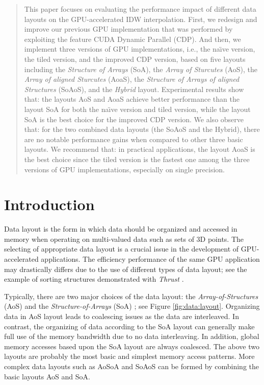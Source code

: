 \begin{abstract}
This paper focuses on evaluating the performance impact of different data 
layouts on the GPU-accelerated IDW interpolation. First, we redesign and improve our 
previous GPU implementation that was performed by exploiting the feature 
CUDA Dynamic Parallel (CDP). And then, we 
implement three versions of GPU implementations, i.e., the na\"{\i}ve 
version, the tiled version, and the improved CDP version, based on five 
layouts including the \textit{Structure of Arrays} (SoA), the \textit{Array of Sturcutes} (AoS), the \textit{Array of aligned Sturcutes} (AoaS), the \textit{Structure of Arrays of aligned Structures} (SoAoS), and the 
\textit{Hybrid} layout. Experimental results show that: the layouts AoS and AoaS achieve 
better performance than the layout SoA for both the na\"{\i}ve version and 
tiled version, while the layout SoA is the best choice for the improved CDP 
version. We also observe that: for the two combined data layouts (the SoAoS 
and the Hybrid), there are no notable performance gains when compared to 
other three basic layouts. We recommend that: in practical applications, the 
layout AoaS is the best choice since the tiled version is the fastest one 
among the three versions of GPU implementations, especially on single 
precision. 
 
\end{abstract}

\section{Introduction}
\label{sec:introduction}

Data layout is the form in which data should be organized and accessed in 
memory when operating on multi-valued data such as sets of 3D points. The 
selecting of appropriate data layout is a crucial issue in the development 
of GPU-accelerated applications. The efficiency performance of the same GPU 
application may drastically differs due to the use of different types of 
data layout; see the example of sorting structures demonstrated with 
\textit{Thrust} \cite{bell2011}. 

Typically, there are two major choices of the data layout: the 
\textit{Array-of-Structures} (AoS) and the \textit{Structure-of-Arrays} (SoA) \cite{farber2011}; see Figure \ref{fig:data:layout}. Organizing data in AoS layout 
leads to coalescing issues as the data are interleaved. In contrast, the 
organizing of data according to the SoA layout can generally make full use 
of the memory bandwidth due to no data interleaving. In addition, global 
memory accesses based upon the SoA layout are always coalesced. The above 
two layouts are probably the most basic and simplest memory access patterns.
More complex data layouts such as AoSoA \cite{abel1999} and SoAoS \cite{siegel2009} can be formed 
by combining the basic layouts AoS and SoA.

